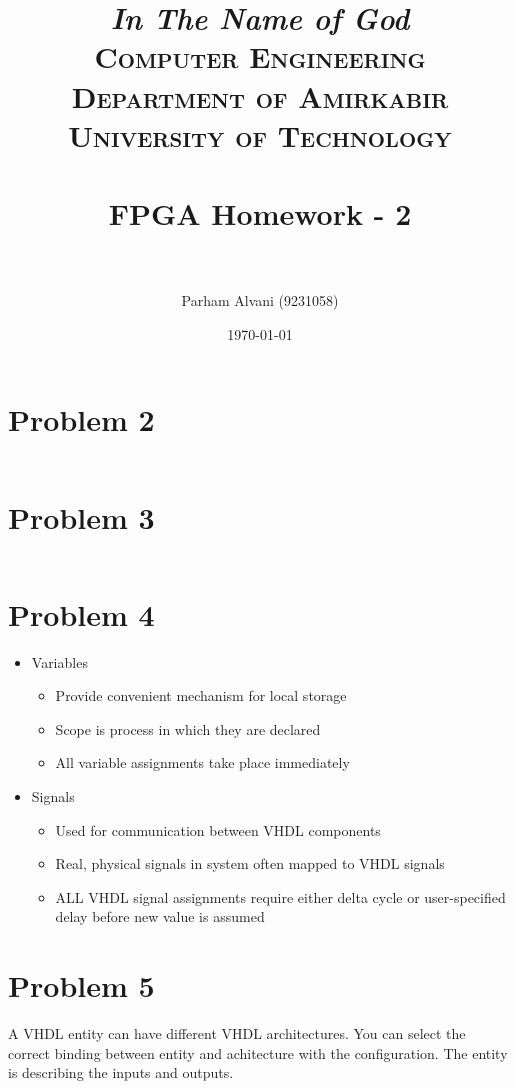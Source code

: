 \documentclass[paper=a4, fontsize=11pt]{scrartcl} %
\title{	
\normalfont \normalsize
\textit{In The Name of God} \\
\textsc{Computer Engineering Department of Amirkabir University of Technology} \\ [25pt]
\horrule{0.5pt} \\[0.4cm] %
\huge FPGA Homework - 2 \\ %
\horrule{2pt} \\[0.5cm] %
}
\author{Parham Alvani (9231058)}
\date{\normalsize\today}
\numberwithin{equation}{section} %
\numberwithin{figure}{section} %
\numberwithin{table}{section} %
\begin{document}
\maketitle


\section{Problem 2}
\inputminted{vhdl}{src/p2/p2.vhd}


\section{Problem 3}
\inputminted{vhdl}{src/p3/p3.vhd}


\section{Problem 4}
\begin{itemize}
	\item Variables
		\begin{itemize}
			\item Provide convenient mechanism for local storage
			\item Scope is process in which they are declared
			\item All variable assignments take place immediately
		\end{itemize}
	\item Signals
		\begin{itemize}
			\item Used for communication between VHDL components
			\item Real, physical signals in system often mapped to VHDL signals
			\item ALL VHDL signal assignments require either delta cycle or
				user-specified delay before new value is assumed
		\end{itemize}
\end{itemize}


\section{Problem 5}
A VHDL entity can have different VHDL architectures.
You can select the correct binding between \textcolor{BurntOrange}{entity}
and \textcolor{BurntOrange}{achitecture} with the \textcolor{BurntOrange}{configuration}.
The entity is describing the inputs and outputs.
\end{document}
